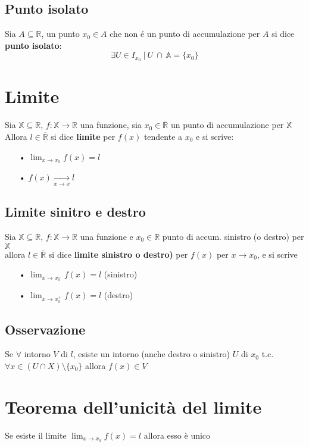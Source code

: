 \subsection{Punto isolato}
Sia $A \subseteq \mathbb{R}$, un punto $x_0 \in A$ che non \'e un punto di accumulazione per $A$ si dice \textbf{punto isolato}:	
\begin{equation}
\exists U \in I_{x_0}\ |\ U\ \cap\ \mathbb{A} = \{x_0\}
\end{equation}

\section{Limite}
Sia $\mathbb{X} \subseteq \mathbb{R}$, $f:\mathbb{X} \rightarrow \mathbb{R}$ una funzione, sia $x_0 \in \overline{\mathbb{R}}$ un punto di accumulazione per $\mathbb{X}$ \\
Allora $l \in \overline{\mathbb{R}}$ si dice \textbf{limite} per $f(x)$ tendente a $x_0$ e si scrive:
\begin{enumerate}
\item[•] $\displaystyle \lim_{x \to x_0}f(x) = l$
\item[•] $\displaystyle f(x) \xrightarrow[x \to x]{} l$
\end{enumerate}
\subsection{Limite sinitro e destro}
Sia $\mathbb{X} \subseteq \mathbb{R}$, $f:\mathbb{X} \rightarrow \mathbb{R}$ una funzione e $x_0 \in \mathbb{R}$ punto di accum. sinistro (o destro) per $\mathbb{X}$ \\
allora $l \in \overline{\mathbb{R}}$ si dice \textbf{limite sinistro o destro)} per $f(x)$ per $x \to x_0$, e si scrive \\
\begin{enumerate}
\item[•] $\displaystyle \lim_{x \to x_0^-}f(x) = l$ (sinistro)
\item[•] $\displaystyle \lim_{x \to x_0^+}f(x) = l$ (destro)\end{enumerate}
\subsection{Osservazione}
Se $\forall$ intorno $V$ di $l$, esiste un intorno (anche destro o sinistro) $U$ di $x_0$ t.c. $\forall x \in (U \cap X) \setminus \{x_0\}$ allora $f(x) \in V$

\section{Teorema dell'unicità del limite}
Se esiste il limite $\displaystyle \lim_{x \to x_0}f(x) = l$ allora esso è unico

